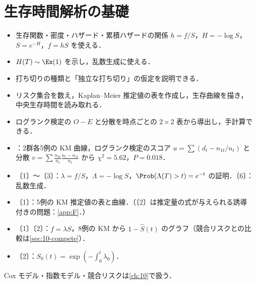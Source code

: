 \chapter{生存時間解析の基礎}\label{ch:09}

\begin{goalbox}
\begin{itemize}
\item 生存関数・密度・ハザード・累積ハザードの関係 $h=f/S$，$H=-\log S$，$S=e^{-H}$，$f=hS$ を使える．
\item $H(T)\sim\Ex(1)$ を示し，乱数生成に使える．
\item 打ち切りの種類と「独立な打ち切り」の仮定を説明できる．
\item リスク集合を数え，Kaplan--Meier 推定値の表を作成し，生存曲線を描き，中央生存時間を読み取れる．
\item ログランク検定の $O-E$ と分散を時点ごとの $2\times2$ 表から導出し，手計算できる．
\end{itemize}
\end{goalbox}

\begin{exambox}
\begin{itemize}
\item {}：2群各5例の KM 曲線，ログランク検定のスコア $u=\sum(d_t-n_{1t}/n_t)$ と分散 $v=\sum\frac{n_{1t}}{n_t}\frac{n_t-n_{1t}}{n_t}$ から $\chi^2=5.62$，$P=0.018$．
\item {}〔1〕〜〔3〕：$\lambda=f/S$，$\Lambda=-\log S$，$\Prob(\Lambda(T)>t)=e^{-t}$ の証明．〔6〕：乱数生成．
\item {}〔1〕：5例の KM 推定値の表と曲線．（〔2〕は推定量の式が与えられる誘導付きの問題：\cref{app:F}．）
\item {}〔1〕〔2〕：$f=\lambda S$，8例の KM から $1-\hat S(t)$ のグラフ（競合リスクとの比較は\cref{sec:10-compete}）．
\item {}〔2〕：$S_0(t)=\exp(-\int_0^t\lambda_0)$．
\end{itemize}
Cox モデル・指数モデル・競合リスクは\cref{ch:10}で扱う．
\end{exambox}


